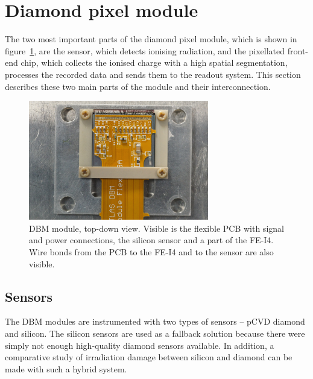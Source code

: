 \section{Diamond pixel module}
\label{sec:atlasdbm}
The two most important parts of the diamond pixel module, which is shown in figure~\ref{fig:dbmmodule}, are the sensor, which detects ionising radiation, and the pixellated front-end chip, which collects the ionised charge with a high spatial segmentation, processes the recorded data and sends them to the readout system. This section describes these two main parts of the module and their interconnection.
\begin{figure}[!t]
\centering
\includegraphics[width=0.7\textwidth]{04_charge_monitoring/pics/mod1}
\caption{DBM module, top-down view. Visible is the flexible PCB with signal and power connections, the silicon sensor and a part of the FE-I4. Wire bonds from the PCB to the FE-I4 and to the sensor are also visible.}
\label{fig:dbmmodule}
\end{figure}
\subsection{Sensors}
The DBM modules are instrumented with two types of sensors -- pCVD diamond and silicon. The silicon sensors are used as a fallback solution because there were simply not enough high-quality diamond sensors available. In addition, a comparative study of irradiation damage between silicon and diamond can be made with such a hybrid system.

